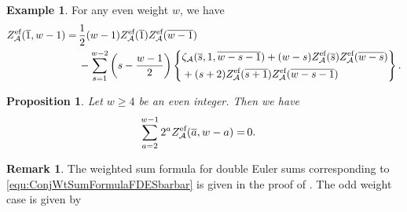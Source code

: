 \documentclass{article}
\newcommand{\calA}{\mathcal{A}}
\newcommand{\eff}{\text{\rm{ef}}}
\newcommand{\ol}{\overline}
\theoremstyle{plain}
\newtheorem{prop}[thm]{Proposition}
\theoremstyle{definition}
\newtheorem{rem}[thm]{Remark}
\newtheorem{eg}[thm]{Example}
\begin{document}
\begin{eg} For any even weight $w$, we have
\begin{align}
Z_\calA^\eff(\ol{1},w-1)
=&\, \frac12(w-1)Z_\calA^\eff(\ol{1})Z_\calA^\eff(\ol{w-1}) \notag \\
&\,-\sum_{s=1}^{w-2} \left( s-\frac{w-1}2 \right)
\left\{\aligned
&\zeta_\calA(\ol{s},1,\ol{w-s-1})+(w-s)Z_\calA^\eff(\ol{s})Z_\calA^\eff(\ol{w-s})\\
&+(s+2)Z_\calA^\eff(\ol{s+1})Z_\calA^\eff(\ol{w-s-1})\endaligned \right\}.\label{equ::KZrel3SMES(1,-1)eg}
\end{align}
\end{eg}



\begin{prop}
Let $w\ge 4$ be an even integer. Then we have
\begin{align}
\sum_{a=2}^{w-1} 2^a Z_\calA^\eff(\ol{a},w-a)=&\,0. \label{equ:ConjWtSumFormulaFDESbarbar}
\end{align}
\end{prop}

\begin{rem}
The weighted sum formula for double Euler sums corresponding to \eqref{equ:ConjWtSumFormulaFDESbarbar} is given in the proof of \cite[Theorem 4.4]{BCJXXZhao2020c}. The odd weight case is given by
\end{rem}
\end{document}
